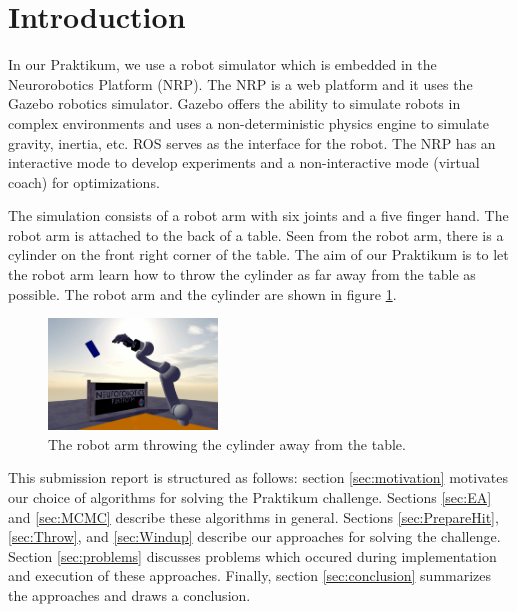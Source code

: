 \section{Introduction}

In our Praktikum, we use a robot simulator which is embedded in the Neurorobotics Platform (NRP). The NRP is a web platform and it uses the Gazebo robotics simulator. Gazebo offers the ability to simulate robots in complex environments and uses a non-deterministic physics engine to simulate gravity, inertia, etc.
ROS serves as the interface for the robot.
The NRP has an interactive mode to develop experiments and a non-interactive mode (virtual coach) for optimizations.

The simulation consists of a robot arm with six joints and a five finger hand. The robot arm is attached to the back of a table. Seen from the robot arm, there is a cylinder on the front right corner of the table. 
The aim of our Praktikum is to let the robot arm learn how to throw the cylinder as far away from the table as possible.
The robot arm and the cylinder are shown in figure \ref{fig:challenge}.

\begin{figure}
	\begin{center}
		\includegraphics[width=0.4\textwidth]{hbpprak_2018}
	\end{center}
	\caption{The robot arm throwing the cylinder away from the table.}
	\label{fig:challenge}
\end{figure}

This submission report is structured as follows: section \ref{sec:motivation} motivates our choice of algorithms for solving the  Praktikum challenge. Sections \ref{sec:EA} and \ref{sec:MCMC} describe these algorithms in general. Sections \ref{sec:PrepareHit}, \ref{sec:Throw}, and \ref{sec:Windup} describe our approaches for solving the challenge.
Section \ref{sec:problems} discusses problems which occured during implementation and execution of these approaches. Finally, section \ref{sec:conclusion} summarizes the approaches and draws a conclusion.
